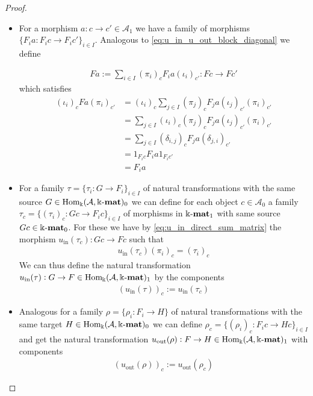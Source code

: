 \begin{proof}
\begin{enumerate}
\begin{subproof}[Proof of (ii)]
\begin{itemize}
\begin{itemize}
\item For a morphism $a : c \rightarrow c' \in \mathcal{A}_{1}$ we have a family of morphisms 
$\{F_{i} a : F_{i} c \rightarrow F_{i} c'\}_{i \in I}$. Analogous to \eqref{eq:u_in_u_out_block_diagonal} we define

\begin{align}
F a := \sum_{i \in I} (\pi_{i})_{c} F_{i} a (\iota_{i})_{c'} : Fc \rightarrow Fc'
\end{align}
which satisfies
\begin{align}
(\iota_{i})_{c} Fa (\pi_{i})_{c'} &= (\iota_{i})_{c} \sum_{j \in I} (\pi_{j})_{c} F_{j} a (\iota_{j})_{c'} (\pi_{i})_{c'} \\
&= \sum_{j \in I} (\iota_{i})_{c} (\pi_{j})_{c} F_{j} a (\iota_{j})_{c'}(\pi_{i})_{c'} \\
&= \sum_{j \in I} (\delta_{i,j})_{c} F_{j} a (\delta_{j,i})_{c'} \\
&= 1_{F_{i} c} F_{i} a 1_{F_{i} c'} \\
&= F_{i} a
\end{align}


\item For a family $\tau = \{ \tau_{i} : G \rightarrow F_{i} \}_{i \in I}$ of natural transformations with the same source
$G \in \mathrm{Hom_{\Bbbk}}(\mathcal{A},\Bbbk\textnormal{-}\mathbf{mat})_{0}$ we can define for each object $c \in \mathcal{A}_{0}$ a family
$\tau_{c} = \{ (\tau_{i})_{c} : Gc \rightarrow F_{i}c \}_{i \in I}$ of morphisms in $\Bbbk\textnormal{-}\mathbf{mat}_{1}$ with same source $Gc \in \Bbbk\textnormal{-}\mathbf{mat}_{0}$.
For these we have by \eqref{eq:u_in_direct_sum_matrix} the morphism $u_{\text{in}}(\tau_{c}) : Gc \rightarrow Fc$ such that
\begin{align}
u_{\text{in}}(\tau_{c}) (\pi_{i})_{c} =
(\tau_{i})_{c}
\end{align}
We can thus define the natural transformation $u_{\text{in}}(\tau) : G \rightarrow F \in \mathrm{Hom_{\Bbbk}}(\mathcal{A},\Bbbk\textnormal{-}\mathbf{mat})_{1}$ by the components
\begin{align}
(u_{\text{in}}(\tau))_{c} := u_{\text{in}}(\tau_{c})
\end{align}
\item Analogous for a family $\rho = \{ \rho_{i} : F_{i} \rightarrow H \}$ of natural transformations with the same target
$H \in \mathrm{Hom_{\Bbbk}}(\mathcal{A},\Bbbk\textnormal{-}\mathbf{mat})_{0}$ we can define $\rho_{c} = \{ (\rho_{i})_{c} : F_{i} c \rightarrow Hc \}_{i \in I}$ and get the
natural transformation $u_{\text{out}}(\rho) : F \rightarrow H \in \mathrm{Hom_{\Bbbk}}(\mathcal{A},\Bbbk\textnormal{-}\mathbf{mat})_{1}$ with components
\begin{align}
(u_{\text{out}}(\rho))_{c} := u_{\text{out}}(\rho_{c})
\end{align}


\end{itemize}
\end{itemize}
\end{subproof}
\end{enumerate}
\end{proof}
